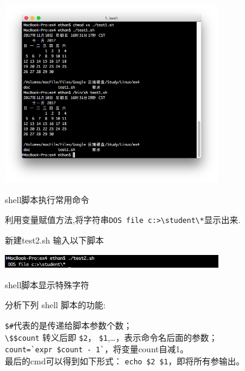 \documentclass{JNUexp}
\begin{document}
\begin{image}
    \includegraphics[width=0.7\textwidth]{1}
    \caption{shell脚本执行常用命令}
\end{image}



\begin{problem}
    利用变量赋值方法,将字符串\lstinline{DOS file c:>\student\*}显示出来.
\end{problem}

\begin{answer}
    新建test2.sh 输入以下脚本
        
\end{answer}

\begin{image}
    \includegraphics[width=0.7\textwidth]{2}
    \caption{shell脚本显示特殊字符}
\end{image}

\begin{problem}
分析下列 shell 脚本的功能:



\end{problem}

\begin{answer}
    \lstinline{$#}代表的是传递给脚本参数个数； \\
    \lstinline{\$$count} 转义后即
    \lstinline{$2}，
    \lstinline{$1},\ldots，表示命令名后面的参数；\\
    \lstinline{count=`expr $count - 1`}，将变量count自减1。\\
    最后的cmd可以得到如下形式：
    \lstinline{echo $2 $1}，即将所有参输出。
\end{answer}
\end{document}
